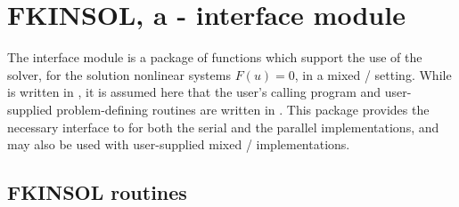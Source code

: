 \section{FKINSOL, a {\F}-{\C} interface module}\label{ss:fcmix}

The {\fkinsol} interface module is a package of {\C} functions which support
the use of the {\kinsol} solver, for the solution nonlinear systems
$F(u)=0$, in a mixed {\F}/{\C} setting.  While {\kinsol} is written
in {\C}, it is assumed here that the user's calling program and
user-supplied problem-defining routines are written in {\F}.
This package provides the necessary interface to {\kinsol} for both the
serial and the parallel {\nvector} implementations, and may also be
used with user-supplied mixed {\F}/{\C} {\nvector} implementations.

\subsection{FKINSOL routines}

